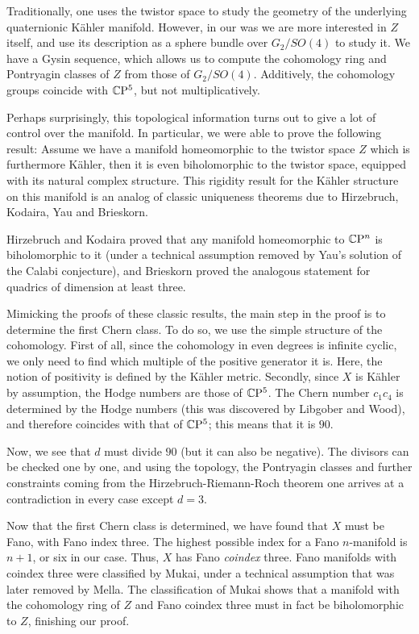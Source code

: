 \documentclass[parskip=half]{scrartcl}
\begin{document}
Traditionally, one uses the twistor space to study the geometry of the underlying quaternionic K\"ahler manifold. However, in our was we are more interested in $Z$ itself, and use its description as a sphere bundle over $G_2/SO(4)$ to study it. We have a Gysin sequence, which allows us to compute the cohomology ring and Pontryagin classes of $Z$ from those of $G_2/SO(4)$. Additively, the cohomology groups coincide with $\mathbb{C}\mathrm{P}^5$, but not multiplicatively.

Perhaps surprisingly, this topological information turns out to give a lot of control over the manifold. In particular, we were able to prove the following result: Assume we have a manifold homeomorphic to the twistor space $Z$ which is furthermore K\"ahler, then it is even biholomorphic to the twistor space, equipped with its natural complex structure. This rigidity result for the K\"ahler structure on this manifold is an analog of classic uniqueness theorems due to Hirzebruch, Kodaira, Yau and Brieskorn. 

Hirzebruch and Kodaira proved that any manifold homeomorphic to $\mathbb{C}\mathrm{P}^n$ is biholomorphic to it (under a technical assumption removed by Yau's solution of the Calabi conjecture), and Brieskorn proved the analogous statement for quadrics of dimension at least three.

Mimicking the proofs of these classic results, the main step in the proof is to determine the first Chern class. To do so, we use the simple structure of the cohomology. First of all, since the cohomology in even degrees is infinite cyclic, we only need to find which multiple of the positive generator it is. Here, the notion of positivity is defined by the K\"ahler metric. Secondly, since $X$ is K\"ahler by assumption, the Hodge numbers are those of $\mathbb{C}\mathrm{P}^5$. The Chern number $c_1c_4$ is determined by the Hodge numbers (this was discovered by Libgober and Wood), and therefore coincides with that of $\mathbb{C}\mathrm{P}^5$; this means that it is $90$.

Now, we see that $d$ must divide $90$ (but it can also be negative). The divisors can be checked one by one, and using the topology, the Pontryagin classes and further constraints coming from the Hirzebruch-Riemann-Roch theorem one arrives at a contradiction in every case except $d=3$.

Now that the first Chern class is determined, we have found that $X$ must be Fano, with Fano index three. The highest possible index for a Fano $n$-manifold is $n+1$, or six in our case. Thus, $X$ has Fano \emph{coindex} three. Fano manifolds with coindex three were classified by Mukai, under a technical assumption that was later removed by Mella. The classification of Mukai shows that a manifold with the cohomology ring of $Z$ and Fano coindex three must in fact be biholomorphic to $Z$, finishing our proof.
\end{document}
